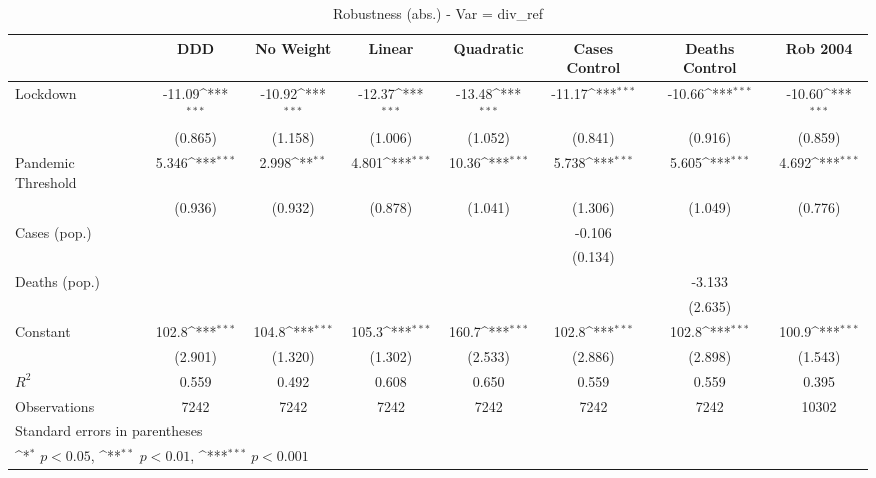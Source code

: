 \documentclass{article}
\begin{document}
{
\def\sym#1{\ifmmode^{#1}\else\(^{#1}\)\fi}
\begin{longtable}{l*{7}{c}}
\caption{Robustness (abs.) - Var = div\_ref}\\
\hline\hline\endfirsthead\hline\endhead\hline\endfoot\endlastfoot
                &\multicolumn{1}{c}{DDD}&\multicolumn{1}{c}{No Weight}&\multicolumn{1}{c}{Linear}&\multicolumn{1}{c}{Quadratic}&\multicolumn{1}{c}{Cases Control}&\multicolumn{1}{c}{Deaths Control}&\multicolumn{1}{c}{Rob 2004}\\
\hline
Lockdown        &   -11.09\sym{***}&   -10.92\sym{***}&   -12.37\sym{***}&   -13.48\sym{***}&   -11.17\sym{***}&   -10.66\sym{***}&   -10.60\sym{***}\\
                &  (0.865)         &  (1.158)         &  (1.006)         &  (1.052)         &  (0.841)         &  (0.916)         &  (0.859)         \\
Pandemic Threshold&    5.346\sym{***}&    2.998\sym{**} &    4.801\sym{***}&    10.36\sym{***}&    5.738\sym{***}&    5.605\sym{***}&    4.692\sym{***}\\
                &  (0.936)         &  (0.932)         &  (0.878)         &  (1.041)         &  (1.306)         &  (1.049)         &  (0.776)         \\
Cases (pop.)    &                  &                  &                  &                  &   -0.106         &                  &                  \\
                &                  &                  &                  &                  &  (0.134)         &                  &                  \\
Deaths (pop.)   &                  &                  &                  &                  &                  &   -3.133         &                  \\
                &                  &                  &                  &                  &                  &  (2.635)         &                  \\
Constant        &    102.8\sym{***}&    104.8\sym{***}&    105.3\sym{***}&    160.7\sym{***}&    102.8\sym{***}&    102.8\sym{***}&    100.9\sym{***}\\
                &  (2.901)         &  (1.320)         &  (1.302)         &  (2.533)         &  (2.886)         &  (2.898)         &  (1.543)         \\
\hline
\(R^{2}\)       &    0.559         &    0.492         &    0.608         &    0.650         &    0.559         &    0.559         &    0.395         \\
Observations    &     7242         &     7242         &     7242         &     7242         &     7242         &     7242         &    10302         \\
\hline\hline
\multicolumn{8}{l}{\footnotesize Standard errors in parentheses}\\
\multicolumn{8}{l}{\footnotesize \sym{*} \(p<0.05\), \sym{**} \(p<0.01\), \sym{***} \(p<0.001\)}\\
\end{longtable}
}
\end{document}
